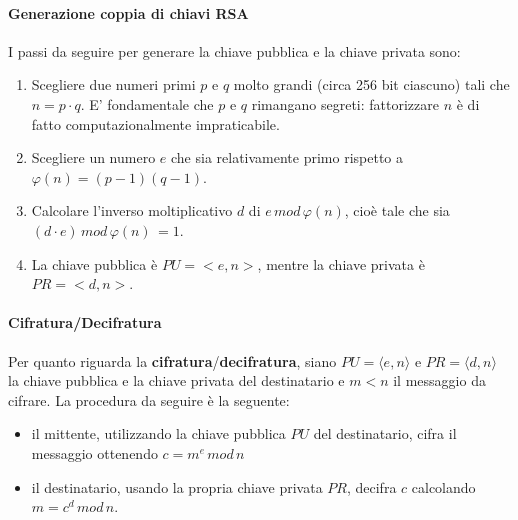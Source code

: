 \paragraph{Generazione coppia di chiavi RSA}
I passi da seguire per generare la chiave pubblica e la chiave privata sono: 
\begin{enumerate}
\item Scegliere due numeri primi $p$ e $q$ molto grandi (circa 256 bit ciascuno) tali che $n = p \cdot q$. E' fondamentale che $p$ e $q$ rimangano segreti: fattorizzare $n$ è di fatto computazionalmente impraticabile. 
\item Scegliere un numero $e$ che sia relativamente primo rispetto a $\varphi(n) = (p-1)(q-1)$.
\item Calcolare l'inverso moltiplicativo $d$ di $e \, mod \, \varphi(n)$, cioè tale che sia $(d \cdot e ) \, mod \, \varphi(n) \, = 1$.
\item La chiave pubblica è $PU = <e,n>$, mentre la chiave privata è $PR = <d,n>$.
\end{enumerate}

\paragraph{Cifratura/Decifratura}
Per quanto riguarda la \textbf{cifratura}/\textbf{decifratura}, siano $PU = \langle e,n \rangle$ e $PR = \langle d,n \rangle$ la chiave pubblica e la chiave privata del destinatario e $m < n$ il messaggio da cifrare. La procedura da seguire è la seguente: 
\begin{itemize}
\item il mittente, utilizzando la chiave pubblica $PU$ del destinatario, cifra il messaggio ottenendo $c = m^e \, mod \, n$
\item il destinatario, usando la propria chiave privata $PR$, decifra $c$ calcolando $m = c^d \, mod \, n$. \end{itemize}

